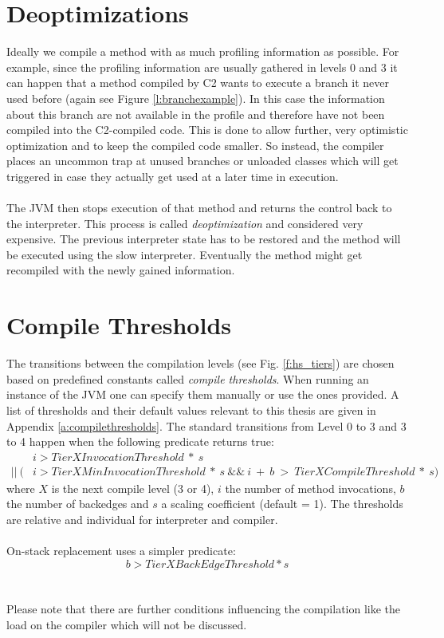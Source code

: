 \section{Deoptimizations}
\label{s:deoptimizations}
Ideally we compile a method with as much profiling information as possible.
For example, since the profiling information are usually gathered in levels 0 and 3 it can happen that a method compiled by C2 wants to execute a branch it never used before (again see Figure \ref{l:branchexample}).
In this case the information about this branch are not available in the profile and therefore have not been compiled into the C2-compiled code.
This is done to allow further, very optimistic optimization and to keep the compiled code smaller. So instead, the compiler places an uncommon trap at unused branches or unloaded classes which will get triggered in case they actually get used at a later time in execution.
\\\\
The JVM then stops execution of that method and returns the control back to the interpreter. This process is called \textit{deoptimization} and considered very expensive. The previous interpreter state has to be restored and the method will be executed using the slow interpreter. Eventually the method might get recompiled with the newly gained information.

\section{Compile Thresholds}
\label{s:compilethresholds}
The transitions between the compilation levels (see Fig. \ref{f:hs_tiers}) are chosen based on predefined constants called \textit{compile thresholds}. When running an instance of the JVM one can specify them manually or use the ones provided. A list of thresholds and their default values relevant to this thesis are given in Appendix \ref{a:compilethresholds}.
The standard transitions from Level 0 to 3 and 3 to 4 happen when the following predicate returns true:
\begin{align*}
& i > TierXInvocationThreshold \ * \ s \\
 || \ (&i > TierXMinInvocationThreshold \ * \ s \ \&\& \ i \ + \ b \ > \ TierXCompileThreshold \ * \ s) 
\end{align*}
where $X$ is the next compile level (3 or 4), $i$ the number of method invocations, $b$ the number of backedges and $s$ a scaling coefficient (default = 1).
The thresholds are relative and individual for interpreter and compiler.
\\\\
On-stack replacement uses a simpler predicate:
$$b > TierXBackEdgeThreshold * s$$
\\\\
Please note that there are further conditions influencing the compilation like the load on the compiler which will not be discussed.


